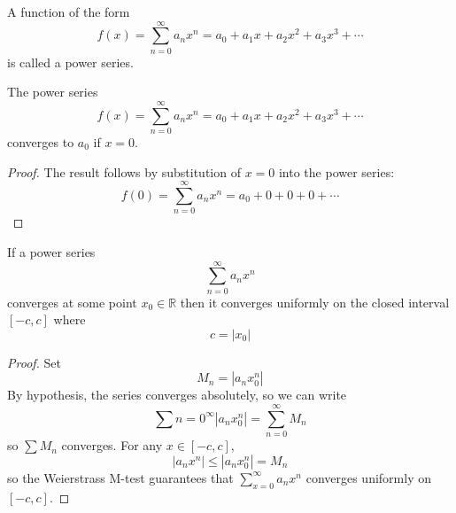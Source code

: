 \begin{definition} A function of the form
\[
f(x) = \sum_{n=0}^\infty a_nx^n = a_0+a_1x+a_2x^2+a_3x^3+\cdots
\]
is called a power series.
\end{definition}
\begin{theorem}
The power series
\[
f(x) = \sum_{n=0}^\infty a_nx^n = a_0+a_1x+a_2x^2+a_3x^3+\cdots
\]
converges to $a_0$ if $x=0$.
\end{theorem}
\begin{proof}
The result follows by substitution of $x=0$ into the power series:
\[
f(0) = \sum_{n=0}^\infty a_nx^n = a_0+0+0+0+\cdots
\]
\end{proof}
\begin{theorem}
If a power series
\[
\sum_{n=0}^\infty a_nx^n
\]
converges at some point $x_0\in\mathbb{R}$ then it converges uniformly on the closed interval $[-c,c]$ where
\[
c = |x_0|
\]
\end{theorem}
\begin{proof}
Set
\[
M_n = |a_nx_0^n|
\]
By hypothesis, the series converges absolutely, so we can write
\[
\sum{n=0}^\infty |a_nx_0^n| = \sum_{n=0}^\infty M_n
\]
so $\sum M_n$ converges.  For any $x\in[-c,c]$,
\[
|a_nx^n|\leq|a_nx_0^n|= M_n
\]
so the Weierstrass M-test guarantees that $\sum_{x=0}^\infty a_nx^n$ converges uniformly on $[-c,c]$. 
\end{proof}
